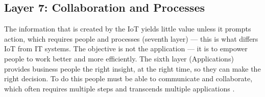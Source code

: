 
\subsection{Layer 7: Collaboration and Processes}
\label{sec:iot-model-layer7}

The information that is created by the \acs{IoT} yields little value unless it prompts action, which requires people and processes (seventh layer) — this is what differs \acs{IoT} from \acl{IT} systems. The objective is not the application — it is to empower people to work better and more efficiently. The sixth layer (Applications) provides business people the right insight, at the right time, so they can make the right decision. To do this people must be able to communicate and collaborate, which often requires multiple steps and transcends multiple applications \cite{Cisco2014}.


